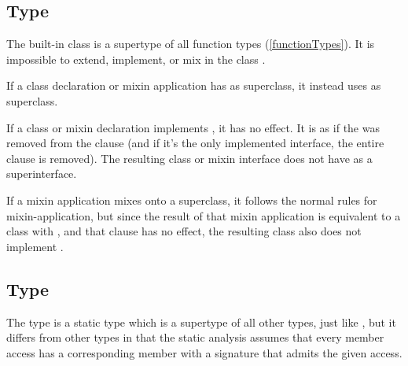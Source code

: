 \documentclass[makeidx]{article}
\begin{document}
{\subsection{Type \FUNCTION}

\LMHash{}%
The built-in class \FUNCTION{} is a supertype of all function types
(\ref{functionTypes}).
It is impossible to extend, implement, or mix in the class \FUNCTION.

\LMHash{}%
If a class declaration or mixin application has \FUNCTION{} as superclass,
it instead uses  as superclass.

\LMHash{}%
If a class or mixin declaration implements \FUNCTION, it has no effect.
It is as if the \FUNCTION{} was removed from the  clause
(and if it's the only implemented interface, the entire clause is removed).
The resulting class or mixin interface
does not have \FUNCTION{} as a superinterface.

\LMHash{}%
If a mixin application mixes \FUNCTION{} onto a superclass, it follows the
normal rules for mixin-application, but since the result of that mixin
application is equivalent to a class with , and
that clause has no effect, the resulting class also does not
implement \FUNCTION.



\subsection{Type \DYNAMIC}

\LMHash{}%
The type \DYNAMIC{} is a static type which is a supertype of all other types,
just like ,
but it differs from other types in that the static analysis
assumes that every member access has a corresponding member
with a signature that admits the given access.


}
\end{document}
